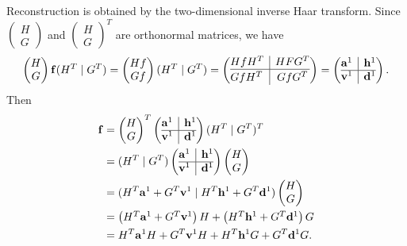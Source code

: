 \documentclass[12pt]{article}
\theoremstyle{definition}
\begin{document}
  Reconstruction is obtained by the two-dimensional inverse Haar transform. Since \((\begin{smallmatrix}
    H \\ G
  \end{smallmatrix})\) and \((\begin{smallmatrix}
    H \\ G
  \end{smallmatrix})^T\) are orthonormal matrices, we have
  \begin{equation*}
    \begin{pmatrix}
      H \\ G
    \end{pmatrix}
    \vb{f} (H^T \mid G^T) =
    \begin{pmatrix}
      Hf \\ Gf
    \end{pmatrix}
    (H^T \mid G^T) =
    \left(\begin{array}{@{}c|c@{}}
      HfH^T & HFG^T \\
      \hline
      {\vrule height 1em depth .4em width -1pt}
      GfH^T & GfG^T
    \end{array}\right)
    =
    \left(\begin{array}{@{}c|c@{}}
      \vb{a}^1 & \vb{h}^1\\
      \hline
      \vb{v}^1 & \vb{d}^1
    \end{array}\right).
  \end{equation*}
  Then
  \begin{align*}
    \vb{f} &=
    \begin{pmatrix}
      H \\ G
    \end{pmatrix}^T
    \left(\begin{array}{@{}c|c@{}}
      \vb{a}^1 & \vb{h}^1\\
      \hline
      \vb{v}^1 & \vb{d}^1
    \end{array}\right)
    (H^T \mid G^T)^T \\ &=
    (H^T \mid G^T)
    \left(\begin{array}{@{}c|c@{}}
      \vb{a}^1 & \vb{h}^1\\
      \hline
      \vb{v}^1 & \vb{d}^1
    \end{array}\right)
    \begin{pmatrix}
      H \\ G
    \end{pmatrix} \\ &=
    (H^T\vb{a}^1 + G^T\vb{v}^1 \mid H^T\vb{h}^1 + G^T\vb{d}^1)
    \begin{pmatrix}
      H \\ G
    \end{pmatrix} \\ &=
    \begin{pmatrix}
      H^T\vb{a}^1 + G^T\vb{v}^1
    \end{pmatrix} H +
    \begin{pmatrix}
      H^T\vb{h}^1 + G^T\vb{d}^1
    \end{pmatrix} G \\ &=
    H^T \vb{a}^1 H +
    G^T \vb{v}^1 H +
    H^T \vb{h}^1 G +
    G^T \vb{d}^1 G.
  \end{align*}
\end{document}
